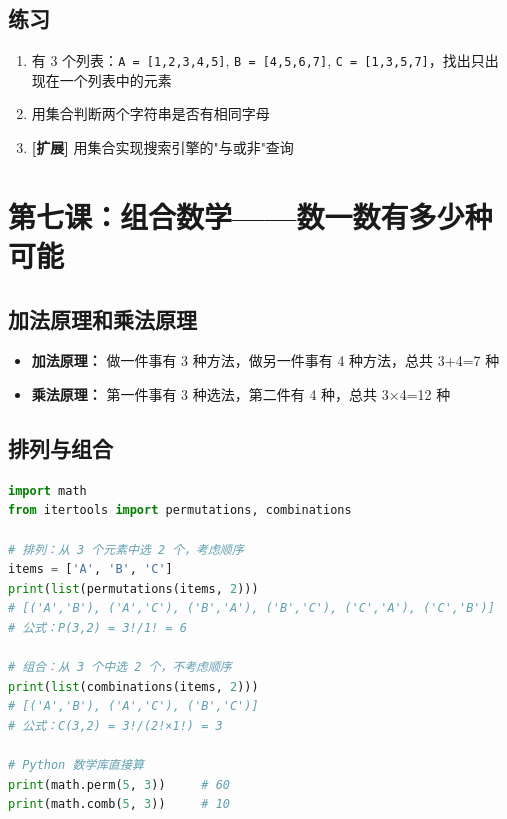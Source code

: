 \documentclass[a4paper,12pt]{ctexart}
\begin{document}
\subsection*{练习}

\begin{enumerate}
  \item 有 3 个列表：\texttt{A = [1,2,3,4,5]}, \texttt{B = [4,5,6,7]}, \texttt{C = [1,3,5,7]}，找出只出现在一个列表中的元素
  \item 用集合判断两个字符串是否有相同字母
  \item \textbf{[扩展]} 用集合实现搜索引擎的"与或非"查询
\end{enumerate}

\section*{第七课：组合数学——数一数有多少种可能}

\subsection*{加法原理和乘法原理}

\begin{itemize}
  \item \textbf{加法原理：} 做一件事有 3 种方法，做另一件事有 4 种方法，总共 3+4=7 种
  \item \textbf{乘法原理：} 第一件事有 3 种选法，第二件有 4 种，总共 3×4=12 种
\end{itemize}

\subsection*{排列与组合}

\begin{lstlisting}[language=Python]
import math
from itertools import permutations, combinations

# 排列：从 3 个元素中选 2 个，考虑顺序
items = ['A', 'B', 'C']
print(list(permutations(items, 2)))
# [('A','B'), ('A','C'), ('B','A'), ('B','C'), ('C','A'), ('C','B')]
# 公式：P(3,2) = 3!/1! = 6

# 组合：从 3 个中选 2 个，不考虑顺序
print(list(combinations(items, 2)))
# [('A','B'), ('A','C'), ('B','C')]
# 公式：C(3,2) = 3!/(2!×1!) = 3

# Python 数学库直接算
print(math.perm(5, 3))     # 60
print(math.comb(5, 3))     # 10
\end{lstlisting}
\end{document}
